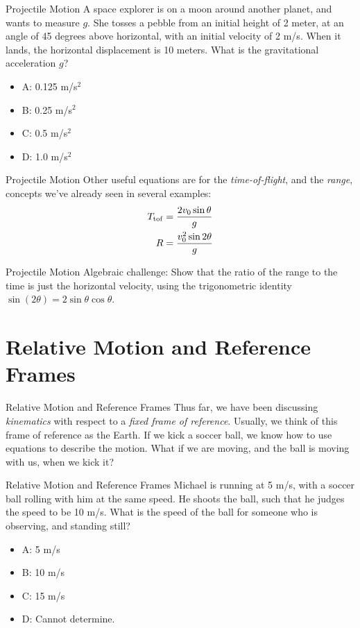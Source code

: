 \documentclass{beamer}
\begin{document}
\begin{frame}{Projectile Motion}
A space explorer is on a moon around another planet, and wants to measure $g$.  She tosses a pebble from an initial height of 2 meter, at an angle of 45 degrees above horizontal, with an initial velocity of 2 m/s.  When it lands, the horizontal displacement is 10 meters.  What is the gravitational acceleration $g$?
\begin{itemize}
\item A: 0.125 m/s$^2$
\item B: 0.25 m/s$^2$
\item C: 0.5 m/s$^2$
\item D: 1.0 m/s$^2$
\end{itemize}
\end{frame}

\begin{frame}{Projectile Motion}
Other useful equations are for the \textit{time-of-flight}, and the \textit{range}, concepts we've already seen in several examples: \\
\begin{align}
T_{\rm tof} &= \frac{2v_{\rm 0}\sin\theta}{g} \\
R &= \frac{v_{\rm 0}^2\sin2\theta}{g}
\end{align}
\end{frame}

\begin{frame}{Projectile Motion}
\alert{Algebraic challenge}: Show that the ratio of the range to the time is just the horizontal velocity, using the trigonometric identity $\sin(2\theta) = 2\sin\theta\cos\theta$.
\end{frame}

\section{Relative Motion and Reference Frames}

\begin{frame}{Relative Motion and Reference Frames}
Thus far, we have been discussing \textit{kinematics} with respect to a \textit{fixed frame of reference}.  Usually, we think of this frame of reference as the Earth.  If we kick a soccer ball, we know how to use equations to describe the motion.  What if we are moving, and the ball is moving with us, when we kick it?
\end{frame}

\begin{frame}{Relative Motion and Reference Frames}
Michael is running at 5 m/s, with a soccer ball rolling with him at the same speed.  He shoots the ball, such that he judges the speed to be 10 m/s.  What is the speed of the ball for someone who is observing, and standing still?
\begin{itemize}
\item A: 5 m/s
\item B: 10 m/s
\item C: 15 m/s
\item D: Cannot determine.
\end{itemize}
\end{frame}
\end{document}
